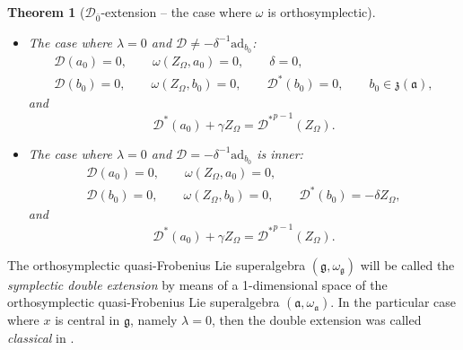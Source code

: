 \documentclass[10pt,a4paper]{amsart}
\numberwithin{equation}{section}
\newtheorem{Theorem}{Theorem}[section]
\begin{document}
\begin{Theorem}[${\mathscr D}_{\bar 0}$-extension -- the case where $\omega$ is orthosymplectic]
\begin{itemize}
\begin{itemize}
\item[$(b)$] The case where $\lambda=0$ and ${\mathscr D}\not =-\delta^{-1}\mathrm{ad}_{b_0}$:
\begin{gather*}
{\mathscr D}(a_0) = 0, \qquad \omega(Z_\Omega, a_0)=0, \qquad\delta = 0, \\
 {\mathscr D}(b_0) = 0,\qquad \omega(Z_\Omega, b_0)=0, \qquad {\mathscr D}^*(b_0) = 0, \qquad b_0\in {\mathfrak z}(\mathfrak{a}),
 \end{gather*}
and
\begin{equation}
\label{eqst2}
{\mathscr D}^*(a_0)+\gamma Z_\Omega= {{\mathscr D}^*}^{p-1}(Z_\Omega).
\end{equation}

\item[$(c)$] The case where $\lambda=0$ and ${\mathscr D}=-\delta^{-1}\mathrm{ad}_{b_0}$ is inner:
\begin{gather*}
{\mathscr D}(a_0) = 0, \qquad \omega(Z_\Omega, a_0)=0, \\
 {\mathscr D}(b_0) = 0, \qquad\omega(Z_\Omega, b_0)=0, \qquad {\mathscr D}^*(b_0) = -\delta Z_\Omega,
 \end{gather*}
and
\begin{equation}
\label{eqst3}
{\mathscr D}^*(a_0)+\gamma Z_\Omega= {{\mathscr D}^*}^{p-1}(Z_\Omega).
\end{equation}
\end{itemize}
\end{itemize}
\end{Theorem}
The orthosymplectic quasi-Frobenius Lie superalgebra $(\mathfrak{g}, \omega_\mathfrak{g})$ will be called the {\it symplectic double extension} by means of a 1-dimensional space of the orthosymplectic quasi-Frobenius Lie superalgebra $(\mathfrak{a}, \omega_\mathfrak{a})$. In the particular case where $x$ is central in $\mathfrak{g}$, namely $\lambda=0$, then the double extension was called {\it classical} in \cite{BaBe, DM1}.
\end{document}
